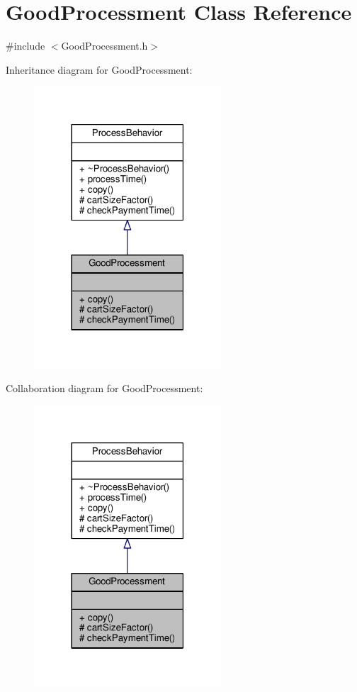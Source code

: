 \hypertarget{classGoodProcessment}{\section{Good\-Processment Class Reference}
\label{classGoodProcessment}
}


{\ttfamily \#include $<$Good\-Processment.\-h$>$}



Inheritance diagram for Good\-Processment\-:\nopagebreak
\begin{figure}[H]
\begin{center}
\leavevmode
\includegraphics[width=198pt]{classGoodProcessment__inherit__graph}
\end{center}
\end{figure}


Collaboration diagram for Good\-Processment\-:\nopagebreak
\begin{figure}[H]
\begin{center}
\leavevmode
\includegraphics[width=198pt]{classGoodProcessment__coll__graph}
\end{center}
\end{figure}
